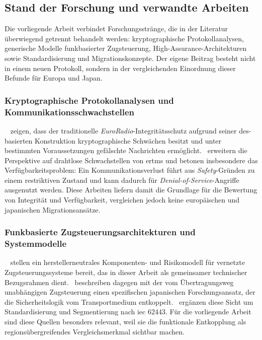 \documentclass[runningheads]{res/llncs}
\begin{document}
\subsection{Stand der Forschung und verwandte Arbeiten}
\label{sec:Stand_der_Forschung_und_verwandte_Arbeiten}
Die vorliegende Arbeit verbindet Forschungsstränge, die in der Literatur überwiegend getrennt behandelt werden: kryptographische Protokollanalysen, generische Modelle funkbasierter Zugsteuerung, High-Assurance-Architekturen sowie Standardisierung und Migrationskonzepte. Der eigene Beitrag besteht nicht in einem neuen Protokoll, sondern in der vergleichenden Einordnung dieser Befunde für Europa und Japan.

\subsubsection{Kryptographische Protokollanalysen und Kommunikationsschwachstellen}
~\cite{chothiaAttack2017} zeigen, dass der traditionelle \textit{EuroRadio}-Integritätsschutz aufgrund seiner \gls{des}-basierten Konstruktion kryptographische Schwächen besitzt und unter bestimmten Voraussetzungen gefälschte Nachrichten ermöglicht.~\cite{gaggeroSurvey2024} erweitern die Perspektive auf drahtlose Schwachstellen von \gls{ertms} und betonen insbesondere das Verfügbarkeitsproblem: Ein Kommunikationsverlust führt aus \textit{Safety}-Gründen zu einem restriktiven Zustand und kann dadurch für \textit{Denial-of-Service}-Angriffe ausgenutzt werden. Diese Arbeiten liefern damit die Grundlage für die Bewertung von Integrität und Verfügbarkeit, vergleichen jedoch keine europäischen und japanischen Migrationsansätze.

\subsubsection{Funkbasierte Zugsteuerungsarchitekturen und Systemmodelle}
~\cite{xiangliuCyber2020} stellen ein herstellerneutrales Komponenten- und Risikomodell für vernetzte Zugsteuerungssysteme bereit, das in dieser Arbeit als gemeinsamer technischer Bezugsrahmen dient.~\cite{iwamotoTrain2024} beschreiben dagegen mit der vom Übertragungsweg unabhängigen Zugsteuerung einen spezifischen japanischen Forschungsansatz, der die Sicherheitslogik vom Transportmedium entkoppelt.~\cite{h.tsukisawaStandardization2024} ergänzen diese Sicht um Standardisierung und Segmentierung nach \gls{iec} 62443. Für die vorliegende Arbeit sind diese Quellen besonders relevant, weil sie die funktionale Entkopplung als regionsübergreifendes Vergleichsmerkmal sichtbar machen.
\end{document}
